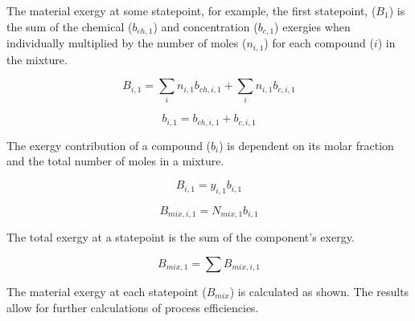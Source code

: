 \documentclass[energies,article,submit,pdftex,moreauthors]{Definitions/mdpi}
\begin{document}
The material exergy at some statepoint, for example, the first statepoint, ($B_{1}$)
is the sum of the chemical ($b_{ch,1}$) and concentration ($b_{c,1}$) exergies
when individually multiplied
by the number of moles ($n_{i,1}$)
for each compound ($i$) in the mixture.

\begin{equation}\label{eq:specific_exergy_of_current_statepoint_definition}
  B_{i,1} = \sum_{i}{n_{i,1}b_{ch,i,1}} + \sum_{i}{n_{i,1}b_{c,i,1}}
\end{equation}

\begin{equation}\label{eq:simplified_material_exergy_of_current_statepoint_definition}
  b_{i,1} = b_{ch,i,1} + b_{c,i,1}
\end{equation}

The exergy contribution of a compound ($b_i$) is dependent
on its molar fraction
and the total number of moles
in a mixture.

\begin{equation}\label{eq:specific_exergy_of_current_statepoint_molar_based_definition}
  B_{i,1} = y_{i,1}b_{i,1}
\end{equation}

\begin{equation}\label{eq:specific_exergy_of_current_statepoint_mixture_definition}
  B_{mix,i,1} = N_{mix,1}b_{i,1}
\end{equation}

The total exergy at a statepoint
is the sum of the component's exergy.

\begin{equation}\label{eq:total_exergy_of_current_statepoint_mixture_definition}
  B_{mix,1} = \sum{B_{mix,i,1}}
\end{equation}

The material exergy at each statepoint ($B_{mix}$) is calculated as shown.
The results allow for further calculations
of process efficiencies.

%
%
%
\end{document}

